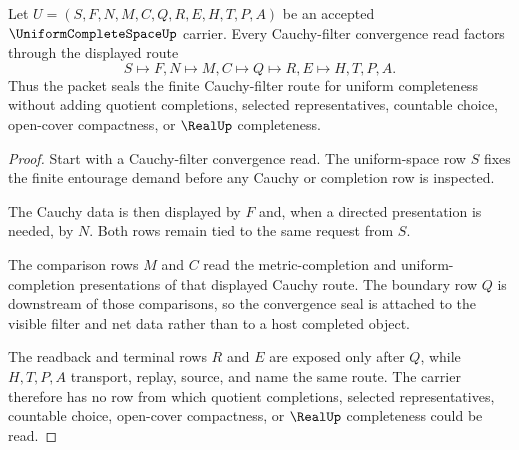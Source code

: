 \begin{theorem}
\label{thm:uniform-complete-space-cauchy-filter-seal}
Let $U=(S,F,N,M,C,Q,R,E,H,T,P,A)$ be an accepted
$\UniformCompleteSpaceUp$ carrier. Every Cauchy-filter convergence read factors
through the displayed route
$$
S \longmapsto F,N \longmapsto M,C \longmapsto Q \longmapsto R,E \longmapsto H,T,P,A .
$$
Thus the packet seals the finite Cauchy-filter route for uniform completeness
without adding quotient completions, selected representatives, countable
choice, open-cover compactness, or $\RealUp$ completeness.
\end{theorem}
\begin{proof}
Start with a Cauchy-filter convergence read. The uniform-space row $S$ fixes
the finite entourage demand before any Cauchy or completion row is inspected.

The Cauchy data is then displayed by $F$ and, when a directed presentation is
needed, by $N$. Both rows remain tied to the same request from $S$.

The comparison rows $M$ and $C$ read the metric-completion and
uniform-completion presentations of that displayed Cauchy route. The boundary
row $Q$ is downstream of those comparisons, so the convergence seal is attached
to the visible filter and net data rather than to a host completed object.

The readback and terminal rows $R$ and $E$ are exposed only after $Q$, while
$H,T,P,A$ transport, replay, source, and name the same route. The carrier
therefore has no row from which quotient completions, selected representatives,
countable choice, open-cover compactness, or $\RealUp$ completeness could be
read.
\end{proof}


\begin{closurestatus}{\UniformCompleteSpaceUp}
  \theoryclosure{\seedClosure}
  \formalstatus{\unformalizedV}
\end{closurestatus}
